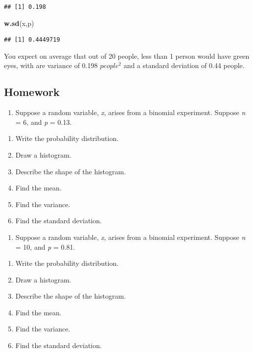 \documentclass[
]{book}
\newenvironment{Shaded}{\begin{snugshade}}{\end{snugshade}}
\newcommand{\KeywordTok}[1]{\textcolor[rgb]{0.13,0.29,0.53}{\textbf{#1}}}
\newcommand{\NormalTok}[1]{#1}
\providecommand{\tightlist}{%
  \setlength{\itemsep}{0pt}\setlength{\parskip}{0pt}}
\begin{document}
\begin{verbatim}
## [1] 0.198
\end{verbatim}

\begin{Shaded}
\begin{Highlighting}[]
\KeywordTok{w.sd}\NormalTok{(x,p)}
\end{Highlighting}
\end{Shaded}

\begin{verbatim}
## [1] 0.4449719
\end{verbatim}

You expect on average that out of 20 people, less than 1 person would have green eyes, with are variance of 0.198 \(people^2\) and a standard deviation of 0.44 people.

\hypertarget{homework-12}{%
\subsection{Homework}\label{homework-12}}

\begin{enumerate}
\def\labelenumi{\arabic{enumi}.}
\tightlist
\item
  Suppose a random variable, \emph{x}, arises from a binomial experiment. Suppose \emph{n} = 6, and \emph{p} = 0.13.
\end{enumerate}

\begin{enumerate}
\def\labelenumi{\alph{enumi}.}
\tightlist
\item
  Write the probability distribution.
\item
  Draw a histogram.
\item
  Describe the shape of the histogram.
\item
  Find the mean.
\item
  Find the variance.
\item
  Find the standard deviation.
\end{enumerate}

\begin{enumerate}
\def\labelenumi{\arabic{enumi}.}
\setcounter{enumi}{1}
\tightlist
\item
  Suppose a random variable, \emph{x}, arises from a binomial experiment. Suppose \emph{n} = 10, and \emph{p} = 0.81.
\end{enumerate}

\begin{enumerate}
\def\labelenumi{\alph{enumi}.}
\tightlist
\item
  Write the probability distribution.
\item
  Draw a histogram.
\item
  Describe the shape of the histogram.
\item
  Find the mean.
\item
  Find the variance.
\item
  Find the standard deviation.
\end{enumerate}
\end{document}
